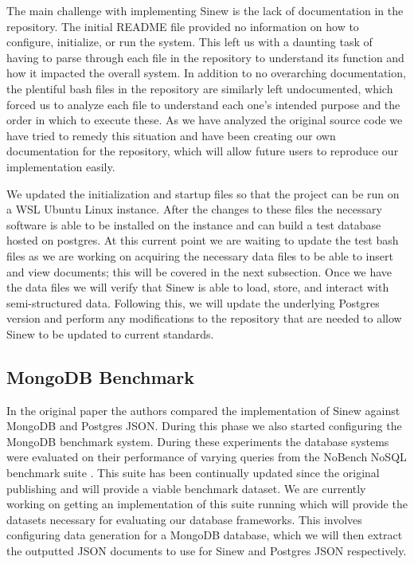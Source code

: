\documentclass[sigconf]{acmart}
\begin{document}
    The main challenge with implementing Sinew is the lack of documentation in the repository. The initial README file provided no information on how to configure, initialize, or run the system. This left us with a daunting task of having to parse through each file in the repository to understand its function and how it impacted the overall system. In addition to no overarching documentation, the plentiful bash files in the repository are similarly left undocumented, which forced us to analyze each file to understand each one's intended purpose and the order in which to execute these. As we have analyzed the original source code we have tried to remedy this situation and have been creating our own documentation for the repository, which will allow future users to reproduce our implementation easily.

    We updated the initialization and startup files so that the project can be run on a WSL Ubuntu Linux instance. After the changes to these files the necessary software is able to be installed on the instance and can build a test database hosted on postgres. At this current point we are waiting to update the test bash files as we are working on acquiring the necessary data files to be able to insert and view documents; this will be covered in the next subsection. Once we have the data files we will verify that Sinew is able to load, store, and interact with semi-structured data. Following this, we will update the underlying Postgres version and perform any modifications to the repository that are needed to allow Sinew to be updated to current standards.

    \subsection{MongoDB Benchmark}
    In the original paper the authors compared the implementation of Sinew against MongoDB and Postgres JSON. During this phase we also started configuring the MongoDB benchmark system. During these experiments the database systems were evaluated on their performance of varying queries from the NoBench NoSQL benchmark suite \cite{NoSQLBench}. This suite has been continually updated since the original publishing and will provide a viable benchmark dataset. We are currently working on getting an implementation of this suite running which will provide the datasets necessary for evaluating our database frameworks. This involves configuring data generation for a MongoDB database, which we will then extract the outputted JSON documents to use for Sinew and Postgres JSON respectively.
\end{document}
